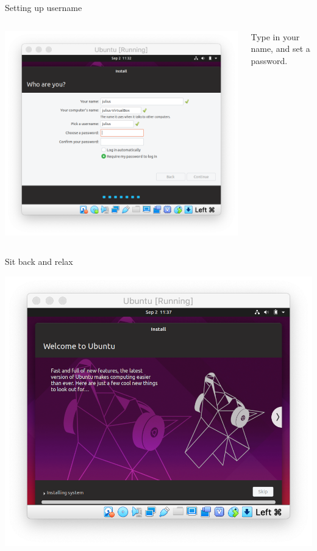 \documentclass[12pt]{beamer}
\begin{document}
\begin{frame}{Setting up username}
  \begin{columns}
    \begin{column}{0.65\linewidth}
      \includegraphics[width=\linewidth]{ubuntu-user}
    \end{column}
    \begin{column}{0.35\linewidth}
      Type in your name, and set a password.
    \end{column}
  \end{columns}
\end{frame}

\begin{frame}{Sit back and relax}
  \begin{center}
    \includegraphics[width=0.8\linewidth]{ubuntu-installing}
  \end{center}
\end{frame}
\end{document}
